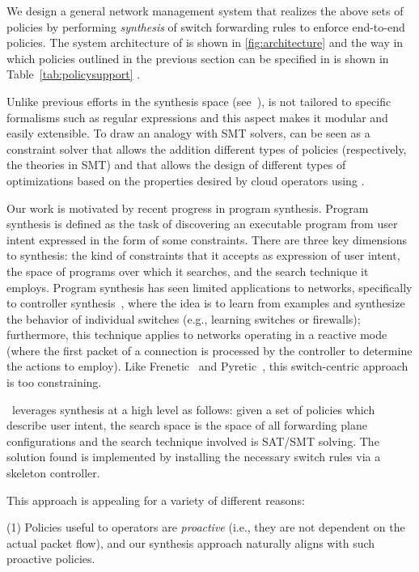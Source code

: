We design a general network management system that realizes the above
sets of policies by performing {\em synthesis} of switch forwarding
rules to enforce end-to-end policies. The system architecture of \name
is shown in \cref{fig:architecture} and the way in which policies
outlined in the previous section can be specified in \name is shown in
Table~\ref{tab:policysupport} .

Unlike previous efforts in the synthesis space (see~\cite{}), \Name is
not tailored to specific formalisms such as regular expressions and
this aspect makes it modular and easily extensible.
To draw an analogy with SMT solvers, \Name can be seen as a constraint
solver that allows the addition different types of policies
(respectively, the theories in SMT) and that allows the design of
different types of optimizations based on the properties desired by cloud
  operators using \Name. 
  
Our work is motivated by recent progress in program synthesis.
Program synthesis is defined as the task of discovering an executable
program from user intent expressed in the form of some
constraints. There are three key dimensions to synthesis: the kind of
constraints that it accepts as expression of user intent, the space of
programs over which it searches, and the search technique it
employs. Program synthesis has seen limited applications to networks,
specifically to controller synthesis~\cite{netegg}, where the idea is
to learn from examples and synthesize the behavior of individual
switches (e.g., learning switches or firewalls); furthermore, this
technique applies to networks operating in a reactive mode (where the
first packet of a connection is processed by the controller to
determine the actions to employ). Like Frenetic~\cite{} and
Pyretic~\cite{}, this switch-centric approach is too constraining.

\Name\ leverages synthesis at a high level as follows: given a set of
policies which describe user intent, the search space is the space of
all forwarding plane configurations and the search technique involved
is SAT/SMT solving. The solution found is implemented by installing
the necessary switch rules via a skeleton controller.

This approach is appealing for a variety of different reasons: 

(1)
Policies useful to operators are \emph{proactive} (i.e., they are not
dependent on the actual packet flow), and our synthesis approach
naturally aligns with such proactive policies.

